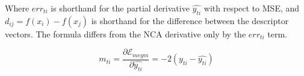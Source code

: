 Where $ err_{ti} $ is shorthand for the partial derivative $ \hat{y_{ti}} $ with respect to \gls{MSE}, and $ d_{ij} = f(x_i) - f(x_j) $ is shorthand for the difference between the descriptor vectors. The formula differs from the \gls{NCA} derivative only by the $ err_{ti} $ term.

\begin{equation}
m_{ti} = \frac{\partial \mathcal{E}_{megm}}{\partial \hat{y_{ti}}} = -2 (y_{ti} - \hat{y_{ti}})
\label{eq:megm_partial}
\end{equation}

